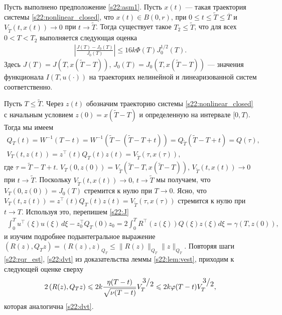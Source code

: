 \documentclass[../main.tex]{subfiles}
\begin{document}
\begin{theorem}\label{s22:th:functional_error_estimate}
 Пусть выполнено предположение \ref{s22:asm1}. 
Пусть $x(t)$ --- такая траектория системы \eqref{s22:nonlinear_closed}, что $x(t)\in B(0,r)$, при $0\leqslant t \leqslant \tilde{T} \leqslant \overline{T} $ и $V_{\tilde{T}}(t,x(t))\to 0$ при $t\to \tilde{T}$. 
 Тогда существует такое $T_2 \leqslant \tilde{T}$, что для всех $0 < T < T_2 $ выполняется следующая оценка
 \begin{gather} \label{s22:est}
 \left| \frac{ J(T) - J_0(T)}{J_0(T)}\right| \leqslant 16k\Phi({T})J^{1/2}_0(T).
 \end{gather}
 Здесь $J(T)=J(T,x(\tilde{T}-T))$, $J_0(T)=J_0(T,x(\tilde{T}-T))$ --- значения функционала $I(T,u(\cdot))$ на траекториях нелинейной и линеаризованной систем соответственно.
\end{theorem}
\doc 
Пусть $T\leqslant \tilde{T}$. 
Через $z(t)$ обозначим траекторию системы \eqref{s22:nonlinear_closed} с начальным условием $z(0)=x(\tilde{T}-T)$ и определенную на интервале $[0,T)$. 
Тогда мы имеем 
\begin{gather*}
Q_T(t)=W^{-1}(T-t)=W^{-1}(\tilde{T}-(\tilde{T}-T+t))=Q_{\tilde{T}}(\tilde{T}-T+t) = Q(\tau), \\ V_T(t,z(t))=z^\top(t)Q_T(t)z(t)=V_{\tilde{T}}(\tau,x(\tau)),
\end{gather*}
где $\tau=\tilde{T}-T+t$. 
$V_T(0,z(0))=V_{\tilde{T}}(\tilde{T}-T, x(\tilde{T}-T))$, $V_{\tilde{T}}(t,x(t))\to 0$ при $t\to \tilde{T}$. 
Поскольку $V_{\tilde{T}}(t,x(t))\to 0$, $t\to \tilde{T}$ мы получаем, что $V_T(0,z(0))=J_0(T)$ стремится к нулю при $T\to 0$.
Ясно, что $V_T(t,z(t))=z^\top(t)Q_T(t)z(t)=V_{\tilde{T}}(\tau,x(\tau))$ стремится к нулю при $t\to T$.
Используя это, перепишем \eqref{s22:J} 
\begin{gather}\label{s22:J1}
 \int_{0}^{T} u^{\top}(\xi) u(\xi) \, d\xi - z_0^{\top} Q_T(0)z_0= 2\int_{0}^{T} R^{\top}(z(\xi))Q(\xi) z(\xi) d\xi=\gamma(T,z(0)),
\end{gather}
и изучим подробнее подынтегральное выражение $\left( R(z), Q_T z\right)=(R(z),z)_{Q_T} \leqslant \| R(z) \|_{Q_T} \| z \|_{Q_T}$.
Повторяя шаги \eqref{s22:rqr_est}, \eqref{s22:dvt} из доказательства леммы \ref{s22:lem:vest}, приходим к следующей оценке сверху
\begin{gather}\label{s22:rqz}
 2 \left( R(z), Q_T z\right) \leqslant 2 k \frac{\eta(T-t)}{\sqrt{\nu(T-t)}}V_T^{\frc{3}{2}} \leqslant 2k \varphi(T-t) V_T^{\frc{3}{2}},
\end{gather}
которая аналогична \eqref{s22:dvt}. 
\end{document}
